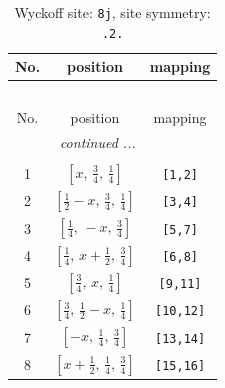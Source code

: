 \documentclass[fleqn,8pt]{jsarticle}
\begin{document}
\begin{longtable}{ccc}
\caption{Wyckoff site: {\tt 8j}, site symmetry: {\tt .2.}}
 \\
 \hline \hline
No. & position & mapping \\ \hline \endfirsthead

\multicolumn{2}{l}{\tablename\ \thetable{}} \\
 \hline \hline
No. & position & mapping \\ \hline \endhead

 \hline \hline
\multicolumn{2}{r}{\footnotesize\it continued ...} \\ \endfoot

 \hline \hline
\multicolumn{2}{r}{} \\ \endlastfoot

1 & $\left[ x,\, \frac{3}{4},\, \frac{1}{4} \right]$ & {\tt [1,2]} \\ \hline
2 & $\left[ \frac{1}{2} - x,\, \frac{3}{4},\, \frac{1}{4} \right]$ & {\tt [3,4]} \\ \hline
3 & $\left[ \frac{1}{4},\, - x,\, \frac{3}{4} \right]$ & {\tt [5,7]} \\ \hline
4 & $\left[ \frac{1}{4},\, x + \frac{1}{2},\, \frac{3}{4} \right]$ & {\tt [6,8]} \\ \hline
5 & $\left[ \frac{3}{4},\, x,\, \frac{1}{4} \right]$ & {\tt [9,11]} \\ \hline
6 & $\left[ \frac{3}{4},\, \frac{1}{2} - x,\, \frac{1}{4} \right]$ & {\tt [10,12]} \\ \hline
7 & $\left[ - x,\, \frac{1}{4},\, \frac{3}{4} \right]$ & {\tt [13,14]} \\ \hline
8 & $\left[ x + \frac{1}{2},\, \frac{1}{4},\, \frac{3}{4} \right]$ & {\tt [15,16]} \\
\end{longtable}
\renewcommand{\arraystretch}{1.2}
\end{document}
